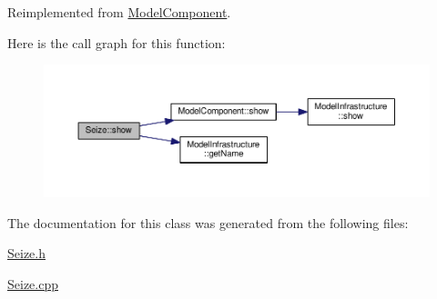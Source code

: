 Reimplemented from \hyperlink{class_model_component_ad8bc846e36b028eab7efb7da6c549eca}{Model\-Component}.



Here is the call graph for this function\-:
\nopagebreak
\begin{figure}[H]
\begin{center}
\leavevmode
\includegraphics[width=350pt]{class_seize_a495ace3a156680b5816c8b285135322c_cgraph}
\end{center}
\end{figure}




The documentation for this class was generated from the following files\-:\begin{DoxyCompactItemize}
\item 
\hyperlink{_seize_8h}{Seize.\-h}\item 
\hyperlink{_seize_8cpp}{Seize.\-cpp}\end{DoxyCompactItemize}
